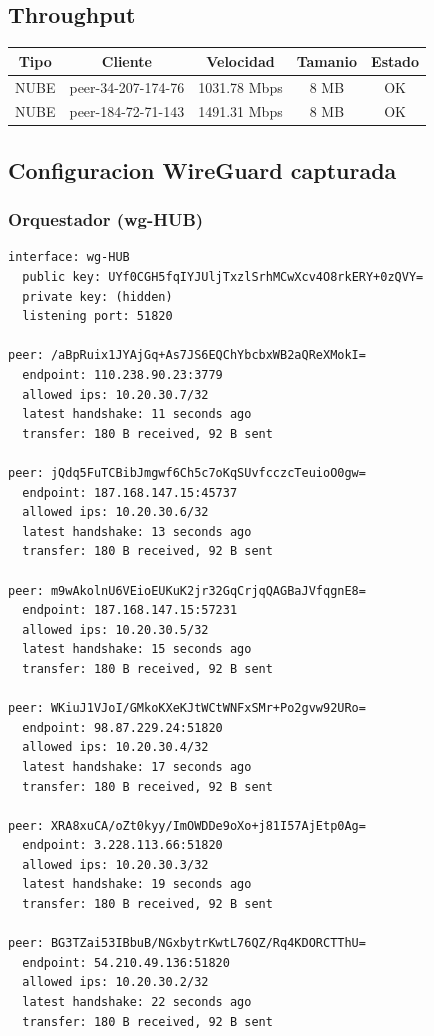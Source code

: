 \documentclass[11pt,a4paper]{article}
\begin{document}
\subsection{Throughput}
\begin{longtable}{|c|c|c|c|c|}
\hline
Tipo & Cliente & Velocidad & Tamanio & Estado \\ \hline
NUBE & peer-34-207-174-76 & 1031.78 Mbps & 8 MB & OK \\ \hline
NUBE & peer-184-72-71-143 & 1491.31 Mbps & 8 MB & OK \\ \hline
\end{longtable}

\subsection{Configuracion WireGuard capturada}
\subsubsection*{Orquestador (wg-HUB)}
\begin{lstlisting}
interface: wg-HUB
  public key: UYf0CGH5fqIYJUljTxzlSrhMCwXcv4O8rkERY+0zQVY=
  private key: (hidden)
  listening port: 51820

peer: /aBpRuix1JYAjGq+As7JS6EQChYbcbxWB2aQReXMokI=
  endpoint: 110.238.90.23:3779
  allowed ips: 10.20.30.7/32
  latest handshake: 11 seconds ago
  transfer: 180 B received, 92 B sent

peer: jQdq5FuTCBibJmgwf6Ch5c7oKqSUvfcczcTeuioO0gw=
  endpoint: 187.168.147.15:45737
  allowed ips: 10.20.30.6/32
  latest handshake: 13 seconds ago
  transfer: 180 B received, 92 B sent

peer: m9wAkolnU6VEioEUKuK2jr32GqCrjqQAGBaJVfqgnE8=
  endpoint: 187.168.147.15:57231
  allowed ips: 10.20.30.5/32
  latest handshake: 15 seconds ago
  transfer: 180 B received, 92 B sent

peer: WKiuJ1VJoI/GMkoKXeKJtWCtWNFxSMr+Po2gvw92URo=
  endpoint: 98.87.229.24:51820
  allowed ips: 10.20.30.4/32
  latest handshake: 17 seconds ago
  transfer: 180 B received, 92 B sent

peer: XRA8xuCA/oZt0kyy/ImOWDDe9oXo+j81I57AjEtp0Ag=
  endpoint: 3.228.113.66:51820
  allowed ips: 10.20.30.3/32
  latest handshake: 19 seconds ago
  transfer: 180 B received, 92 B sent

peer: BG3TZai53IBbuB/NGxbytrKwtL76QZ/Rq4KDORCTThU=
  endpoint: 54.210.49.136:51820
  allowed ips: 10.20.30.2/32
  latest handshake: 22 seconds ago
  transfer: 180 B received, 92 B sent

\end{lstlisting}
\end{document}
